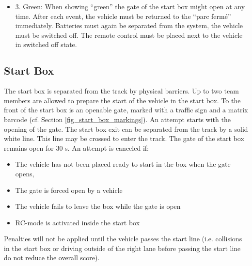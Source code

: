 \documentclass[a4paper]{report}
\begin{document}
{{{\begin{itemize}
\item 3. Green: When showing “green” the gate of the start box might open at any time. After each event, the vehicle must be returned to the “parc fermé” immediately. Batteries must again be separated from the system, the vehicle must be switched off. The remote control must be placed next to the vehicle in switched off state. 
\end{itemize}

\subsection{Start Box}
\label{start_box}

The start box is separated from the track by physical barriers. Up to two team members are allowed to prepare the start of the vehicle in the start box. To the front of the start box is an openable gate, marked with a traffic sign and a matrix barcode (cf. Section \ref{fig_start_box_markings}). An attempt starts with the opening of the gate. The start box exit can be separated from the track by a solid white line. This line may be crossed to enter the track. The gate of the start box remains open for 30 s. An attempt is canceled if: 

\begin{itemize}
	\item The vehicle has not been placed ready to start in the box when the gate opens,
	\item The gate is forced open by a vehicle

	\item The vehicle fails to leave the box while the gate is open 

	\item RC-mode is activated inside the start box
\end{itemize}

Penalties will not be applied until the vehicle passes the start line (i.e. collisions in the start box or driving outside of the right lane before passing the start line do not reduce the overall score). 

}}}
\end{document}
